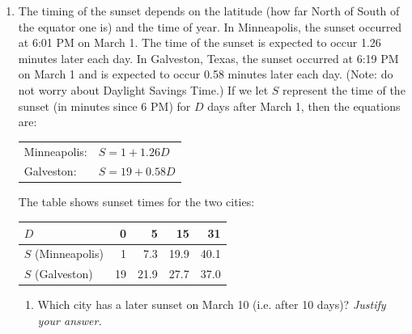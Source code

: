 \documentclass[12pt]{article}
\begin{document}
\begin{enumerate}
\newpage %
\item The timing of the sunset depends on the latitude (how far North of South of the equator one is) and the time of year.  In Minneapolis, the sunset occurred at 6:01 PM on March 1.  The time of the sunset is expected to occur 1.26 minutes later each day.  In Galveston, Texas, the sunset occurred at 6:19 PM on March 1 and is expected to occur 0.58 minutes later each day.  (Note: do not worry about Daylight Savings Time.) If we let $S$ represent the time of the sunset (in minutes since 6 PM) for $D$ days after March 1, then the equations are:

\vspace{.1in}

\begin{center}
\begin{tabular} {ll} 
Minneapolis: &$S=1+1.26D$ \\
Galveston: & $S=19+0.58D$ \\
\end{tabular}
\end{center}

The table shows sunset times for the two cities:

\begin{center}
\begin{tabular} {|l|r|r|r|r|} \hline
$D$ & 0 & 5 & 15 & 31 \\ \hline
$S$ (Minneapolis) & 1 &  7.3 & 19.9 & 40.1  \\ \hline
$S$ (Galveston) & 19 & 21.9 & 27.7 & 37.0 \\ \hline
\end{tabular}
\end{center}

\begin{enumerate}

\item Which city has a later sunset on March 10 (i.e. after 10 days)?  \emph{Justify your answer.}
\vfill


\end{enumerate}
\end{enumerate}
\end{document}
